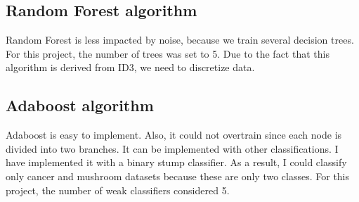 \subsection{Random Forest algorithm}
Random Forest is less impacted by noise, because we train several decision trees. For this project, the number of trees was set to 5. Due to the fact that this algorithm is derived from ID3, we need to discretize data. 

\begin{table}[H]
\centering
\caption{The accuracy of Random Forest on cancer dataset.}
\label{tab:tab_rf_cancer}

\end{table}


\begin{table}[H]
\centering
\caption{The accuracy of Random Forest on cars dataset.}
\label{tab:tab_rf_cars}

\end{table}

\begin{table}[H]
\centering
\caption{The accuracy of Random Forest on ecol dataset.}
\label{tab:tab_rf_ecol}

\end{table}

\begin{table}[H]
\centering
\caption{The accuracy of Random Forest on letter dataset.}
\label{tab:tab_rf_letter}

\end{table}


\begin{table}[H]
\centering
\caption{The accuracy of Random Forest on mushroom dataset.}
\label{tab:tab_rf_mushroom}

\end{table}







\subsection{Adaboost algorithm}
Adaboost is easy to implement. Also, it could not overtrain since each node is divided into two branches. It can be implemented with other classifications. I have implemented it with a binary stump classifier. As a result, I could classify only cancer and mushroom datasets because these are only two classes. For this project, the number of weak classifiers considered 5.





